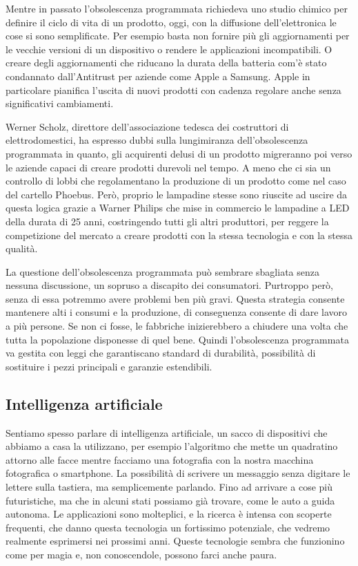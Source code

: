 \documentclass[12pt]{book} %
\begin{document}
Mentre in passato l'obsolescenza programmata richiedeva uno studio chimico per definire il ciclo di
vita di un prodotto, oggi, con la diffusione dell'elettronica le cose si sono semplificate. Per
esempio basta non fornire più gli aggiornamenti per le vecchie versioni di un dispositivo o rendere le applicazioni
incompatibili. O creare degli aggiornamenti che riducano la durata della batteria com'è stato
condannato dall'Antitrust per aziende come Apple a Samsung. Apple in particolare pianifica l'uscita di nuovi prodotti con cadenza regolare anche senza significativi cambiamenti. 

Werner Scholz, direttore dell'associazione tedesca dei costruttori di elettrodomestici, ha espresso dubbi sulla
lungimiranza dell'obsolescenza programmata in quanto, gli acquirenti delusi di un prodotto migreranno poi verso le
aziende capaci di creare prodotti durevoli nel tempo. A meno che ci sia un controllo di lobbi che regolamentano la
produzione di un prodotto come nel caso del cartello Phoebus. Però, proprio le lampadine stesse sono riuscite ad uscire
da questa logica grazie a Warner Philips che mise in commercio le lampadine a LED della durata di 25 anni, costringendo
tutti gli altri produttori, per reggere la competizione del mercato a creare prodotti con la stessa tecnologia e con la
stessa qualità.

La questione dell'obsolescenza programmata può sembrare sbagliata senza nessuna discussione, un
sopruso a discapito dei consumatori. Purtroppo però, senza di essa potremmo avere problemi ben più gravi. Questa strategia
consente mantenere alti i consumi e la produzione, di conseguenza consente di dare lavoro a più persone. Se non ci
fosse, le fabbriche inizierebbero a chiudere una volta che tutta la popolazione disponesse di quel bene. 
Quindi l'obsolescenza programmata va gestita con leggi che garantiscano standard di durabilità, possibilità di
sostituire i pezzi principali e garanzie estendibili.

\subsection{Intelligenza artificiale}
Sentiamo spesso parlare di intelligenza artificiale, un sacco di dispositivi che abbiamo a casa la utilizzano, per
esempio l'algoritmo che mette un quadratino attorno alle facce mentre facciamo una fotografia con
la nostra macchina fotografica o smartphone. La possibilità di scrivere un messaggio senza digitare le lettere sulla
tastiera, ma semplicemente parlando. Fino ad arrivare a cose più futuristiche, ma che in alcuni stati possiamo già
trovare, come le auto a guida autonoma. Le applicazioni sono molteplici, e la ricerca è intensa con scoperte frequenti, che danno questa tecnologia un fortissimo potenziale, che vedremo realmente esprimersi nei prossimi anni. Queste tecnologie sembra che funzionino come per magia
e, non conoscendole, possono farci anche paura. 
\end{document}
